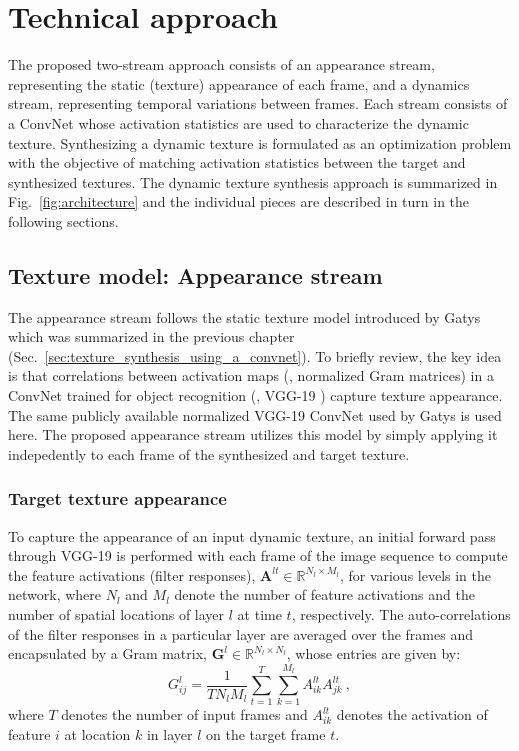 \chapter{Technical approach}

The proposed two-stream approach consists of an appearance
stream, representing the static (texture) appearance of each frame,
and a dynamics stream, representing temporal 
variations between frames.
Each stream consists of a ConvNet whose activation 
statistics are used to characterize the dynamic texture.
Synthesizing a dynamic texture is formulated as an optimization 
problem with the objective of matching activation 
statistics between the target and synthesized textures.
The dynamic texture synthesis approach is summarized in Fig.\ \ref{fig:architecture}
and the individual pieces are described in turn in the
following sections.



\section{Texture model: Appearance stream}

The appearance stream follows the static texture model
introduced by Gatys \etal \cite{gatys2015} which was summarized in the previous chapter (Sec.\ \ref{sec:texture_synthesis_using_a_convnet}).
To briefly review, the key idea is that correlations between activation maps (\ie, normalized Gram matrices) in a 
ConvNet trained for 
object recognition (\eg, VGG-19 \cite{simonyan2014very}) 
capture texture appearance.
The same publicly available normalized VGG-19 ConvNet \cite{simonyan2014very} used by Gatys \etal \cite{gatys2015} is used here. The proposed appearance stream utilizes this model by simply applying it indepedently to each frame of the synthesized and target texture.

\subsection{Target texture appearance}

To capture the appearance of an input dynamic texture, an initial forward pass through VGG-19 is performed with each frame of the image sequence to compute the feature activations (filter responses),
$\mathbf{A}^{lt} \in \mathbb{R}^{N_l\times M_l}$, for various
levels in the network, where $N_l$ and $M_l$ denote
the number of feature activations and the number of spatial locations of layer
$l$ at time $t$, respectively.
The auto-correlations of the filter responses in a particular layer are
averaged over the frames and encapsulated by a Gram matrix,
$\mathbf{G}^{l} \in \mathbb{R}^{N_l \times N_l}$, whose
entries are given by:
\begin{equation}
	G_{ij}^l = \frac{1}{T N_l M_l} \sum_{t=1}^T \sum_{k=1}^{M_l} A_{ik}^{lt} A_{jk}^{lt}\ ,
	\label{eq:gram_target}
\end{equation}
where $T$ denotes the number of input frames
and $A_{ik}^{lt}$ denotes the activation of feature $i$ at
location $k$ in layer $l$ on the target frame $t$.

